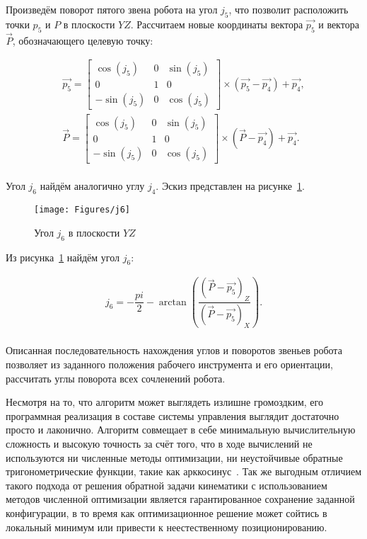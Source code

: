 Произведём поворот пятого звена робота на угол $j_5$, что позволит расположить точки $p_5$ и $P$ в плоскости $YZ$.
Рассчитаем новые координаты вектора $\overrightarrow{p_5}$ и вектора $\overrightarrow{P}$, обозначающего целевую точку:

\begin{gather*}
    \overrightarrow{p_5} =
    \begin{bmatrix}
        \cos(j_5)  & 0 & \sin(j_5) \\
        0          & 1 & 0         \\
        -\sin(j_5) & 0 & \cos(j_5)
    \end{bmatrix} \times \left( \overrightarrow{p_5} - \overrightarrow{p_4} \right) + \overrightarrow{p_4}, \\
    \overrightarrow{P} =
    \begin{bmatrix}
        \cos(j_5)  & 0 & \sin(j_5) \\
        0          & 1 & 0         \\
        -\sin(j_5) & 0 & \cos(j_5)
    \end{bmatrix} \times \left( \overrightarrow{P} - \overrightarrow{p_4} \right) + \overrightarrow{p_4}.
\end{gather*} \\

Угол $j_6$ найдём аналогично углу $j_4$.
Эскиз представлен на рисунке~\ref{fig:ikp:j6}.

\begin{figure}[H]
    \centering
    \vspace{14pt}
    \texttt{[image: Figures/j6]}
    \caption{Угол $j_6$ в плоскости $YZ$}
    \label{fig:ikp:j6}
\end{figure}

Из рисунка~\ref{fig:ikp:j6} найдём угол $j_6$:

\begin{gather*}
    j_6 = -\dfrac{pi}{2} - \arctan \left( \dfrac
    {\left( \overrightarrow{P} - \overrightarrow{p_5} \right)_Z}
    {\left( \overrightarrow{P} - \overrightarrow{p_5} \right)_X} \right).
\end{gather*} \\

Описанная последовательность нахождения углов и поворотов звеньев робота позволяет из заданного положения рабочего инструмента и его ориентации, рассчитать углы поворота всех сочленений робота.

Несмотря на то, что алгоритм может выглядеть излишне громоздким, его программная реализация в составе системы управления выглядит достаточно просто и лаконично.
Алгоритм совмещает в себе минимальную вычислительную сложность и высокую точность за счёт того, что в ходе вычислений не используются ни численные методы оптимизации, ни неустойчивые обратные тригонометрические функции, такие как арккосинус~\cite{bib:Fu_1987}.
Так же выгодным отличием такого подхода от решения обратной задачи кинематики с использованием методов численной оптимизации является гарантированное сохранение заданной конфигурации, в то время как оптимизационное решение может сойтись в локальный минимум или привести к неестественному позиционированию.
